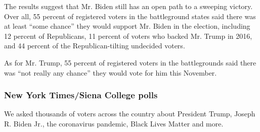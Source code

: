 The results suggest that Mr. Biden still has an open path to a sweeping
victory. Over all, 55 percent of registered voters in the battleground
states said there was at least ``some chance'' they would support Mr.
Biden in the election, including 12 percent of Republicans, 11 percent
of voters who backed Mr. Trump in 2016, and 44 percent of the
Republican-tilting undecided voters.

As for Mr. Trump, 55 percent of registered voters in the battlegrounds
said there was ``not really any chance'' they would vote for him this
November.

\hypertarget{new-york-timessiena-college-polls}{%
\subsubsection{New York Times/Siena College
polls}\label{new-york-timessiena-college-polls}}

We asked thousands of voters across the country about President Trump,
Joseph R. Biden Jr., the coronavirus pandemic, Black Lives Matter and
more.

